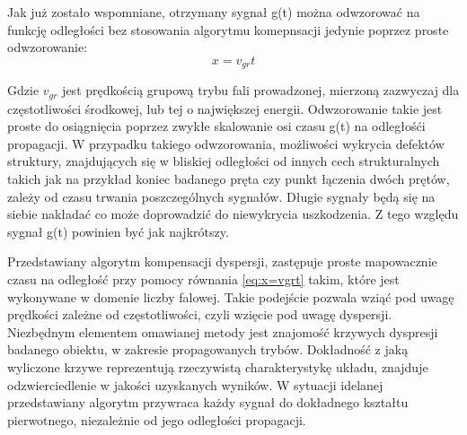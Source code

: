 Jak już zostało wspomniane, otrzymany sygnał g(t) można odwzorować na funkcję odległości bez stosowania algorytmu komepnsacji jedynie poprzez proste odwzorowanie:
\begin{equation}
x=v_{gr}t \label{eq:x=vgrt}
\end{equation}

Gdzie $v_{gr}$ jest prędkością grupową trybu fali prowadzonej, mierzoną zazwyczaj dla częstotliwości środkowej, lub tej o największej energii. Odwzorowanie takie jest proste do osiągnięcia poprzez zwykłe skalowanie osi czasu g(t) na odległośći propagacji. W przypadku takiego odwzorowania, możliwości wykrycia defektów struktury, znajdujących się w bliskiej odległości od innych cech strukturalnych takich jak na przykład koniec badanego pręta czy punkt łączenia dwóch prętów, zależy od czasu trwania poszczególnych sygnałów. Długie sygnały będą się na siebie nakładać co może doprowadzić do niewykrycia uszkodzenia. Z tego względu sygnał g(t) powinien być jak najkrótszy. 

Przedstawiany algorytm kompensacji dyspersji, zastępuje proste mapowacznie czasu na odległość przy pomocy równania \ref{eq:x=vgrt} takim, które jest wykonywane w domenie liczby falowej. Takie podejście pozwala wziąć pod uwagę prędkości zależne od częstotliwości, czyli wzięcie pod uwagę dyspersji. Niezbędnym elementem omawianej metody jest znajomość krzywych dyspresji badanego obiektu, w zakresie propagowanych trybów. Dokładność z jaką wyliczone krzywe reprezentują rzeczywistą charakterystykę układu, znajduje odzwierciedlenie w jakości uzyskanych wyników. W sytuacji idelanej przedstawiany algorytm przywraca każdy sygnał do dokładnego kształtu pierwotnego, niezależnie od jego odległości propagacji.  

